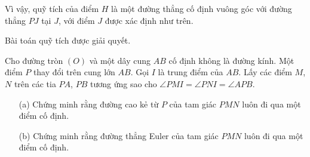 \begin{solution}
\begin{enumerate}
\begin{enumerate}[leftmargin=1.25cm]
                \end{enumerate}

                Vì vậy, quỹ tích của điểm \(H\) là một đường thẳng cố định vuông góc với đường thẳng \(PJ\) tại \(J\), với điểm \(J\) được xác định như trên.
                
            \end{enumerate}

        Bài toán quỹ tích được giải quyết.
        \end{solution}

        \newpage

        \begin{problem}
            Cho đường tròn \((O)\) và một dây cung \(AB\) cố định không là đường kính. Một điểm \(P\) thay đổi trên cung lớn \(AB\). Gọi \(I\) là trung điểm của \(AB\). Lấy các điểm \(M\), \(N\) trên các tia \(PA\), \(PB\) tương ứng sao cho \(\angle PMI = \angle PNI = \angle APB\).
            \begin{enumerate}
                \item[(a)] Chứng minh rằng đường cao kẻ từ \(P\) của tam giác \(PMN\) luôn đi qua một điểm cố định.
                \item[(b)] Chứng minh rằng đường thẳng Euler của tam giác \(PMN\) luôn đi qua một điểm cố định.
            \end{enumerate}
        \end{problem}

